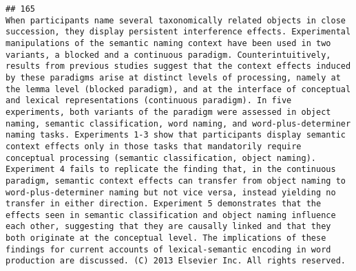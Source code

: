 \documentclass[
  english,
  man]{apa6}
\begin{document}
\begin{verbatim}
## 165                                                                                                                                                                                                                                                                                                                                                                                                                                                                                                                                                                                                                                                                                                                                                                                                                                                                                                                                                                                                                                                                                                                           When participants name several taxonomically related objects in close succession, they display persistent interference effects. Experimental manipulations of the semantic naming context have been used in two variants, a blocked and a continuous paradigm. Counterintuitively, results from previous studies suggest that the context effects induced by these paradigms arise at distinct levels of processing, namely at the lemma level (blocked paradigm), and at the interface of conceptual and lexical representations (continuous paradigm). In five experiments, both variants of the paradigm were assessed in object naming, semantic classification, word naming, and word-plus-determiner naming tasks. Experiments 1-3 show that participants display semantic context effects only in those tasks that mandatorily require conceptual processing (semantic classification, object naming). Experiment 4 fails to replicate the finding that, in the continuous paradigm, semantic context effects can transfer from object naming to word-plus-determiner naming but not vice versa, instead yielding no transfer in either direction. Experiment 5 demonstrates that the effects seen in semantic classification and object naming influence each other, suggesting that they are causally linked and that they both originate at the conceptual level. The implications of these findings for current accounts of lexical-semantic encoding in word production are discussed. (C) 2013 Elsevier Inc. All rights reserved.

\end{verbatim}
\end{document}
